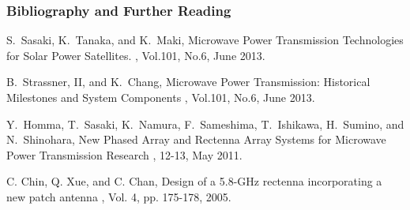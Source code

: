 \documentclass{beamer}
\begin{document}
\appendix
\begin{frame}[label=citation]
  \frametitle<presentation>{Bibliography and Further Reading}
    
  \begin{thebibliography}{10}
     
    \footnotesize
    \beamertemplatearticlebibitems

    S.~Sasaki, K.~Tanaka, and K.~Maki,
    \newblock Microwave Power Transmission Technologies for Solar
    Power Satellites.
    , Vol.101, No.6,
    June 2013.

    B.~Strassner, II, and K.~Chang,
    \newblock Microwave Power Transmission: Historical Milestones
    and System Components
    , Vol.101, No.6,
    June 2013.

    Y.~Homma, T.~Sasaki, K.~Namura, F.~Sameshima, T.~Ishikawa,
    H.~Sumino, and N.~Shinohara,
    \newblock New Phased Array and Rectenna Array Systems for
    Microwave Power Transmission Research
    , 12-13, May 2011.

    C. Chin, Q. Xue, and C. Chan,
    \newblock Design of a 5.8-GHz rectenna incorporating a new
    patch antenna
    ,
    Vol. 4, pp. 175-178, 2005.
  \end{thebibliography}
\end{frame}
\end{document}
